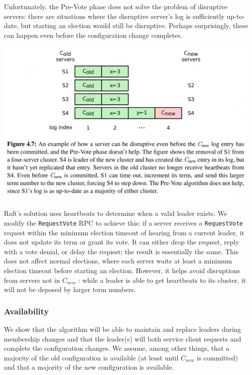 \documentclass[11pt]{article}
\begin{document}
Unfortunately, the Pre-Vote phase does not solve the problem of disruptive servers: there are
situations where the disruptive server’s log is sufficiently up-to-date, but starting an election
would still be disruptive. Perhaps surprisingly, these can happen even before the configuration change
completes.

\begin{center}
\includegraphics[width=.99\textwidth]{../../images/papers/20.png}
\label{}
\end{center}


Raft’s solution uses heartbeats to determine when a valid leader exists. We modify the \texttt{RequestVote} RPC
to achieve this: if a server receives a \texttt{RequestVote} request within the minimum election timeout of
hearing from a current leader, it does not update its term or grant its vote. It can either drop the
request, reply with a vote denial, or delay the request; the result is essentially the same. This does
not affect normal elections, where each server waits at least a minimum election timeout before
starting an election. However, it helps avoid disruptions from servers not in \(C_{new}\) : while a leader is
able to get heartbeats to its cluster, it will not be deposed by larger term numbers. \label{Problem1}
\subsubsection{Availability}
\label{sec:org8623771}
\label{Problem2}
We show that the algorithm will be able to maintain and replace leaders during membership changes and
that the leader(s) will both service client requests and complete the configuration changes. We
assume, among other things, that a majority of the old configuration is available (at least until \(C_{new}\)
is committed) and that a majority of the new configuration is available.
\end{document}
